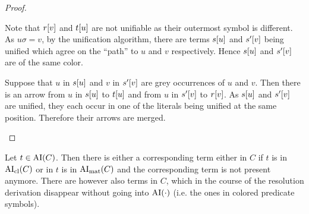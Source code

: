 \documentclass[,%
	paper=a4,%
	DIV14, %
	twoside=false,%
	liststotoc,
	bibtotoc,
	draft=false,%
	numbers=noendperiod
]{scrartcl}
\begin{document}
\begin{proof}
\begin{itemize}
			Note that $r[v]$ and $t[u]$ are not unifiable as their outermost symbol is different.
			As $u\sigma = v$, by the unification algorithm, there are terms $s[u]$ and $s'[v]$ being unified which agree on the ``path'' to $u$ and $v$ respectively.
			Hence $s[u]$ and $s'[v]$ are of the same color.


			Suppose that $u$ in $s[u]$ and $v$ in $s'[v]$ are grey occurrences of $u$ and $v$.
			Then there is an arrow from $u$ in $s[u]$ to $t[u]$ and from $u$ in $s'[v]$ to $r[v]$. 
			As $s[u]$ and $s'[v]$ are unified, they each occur in one of the literals being unified at the same position.
			Therefore their arrows are merged.
	\end{itemize}
\end{proof}

\begin{prop}
	Let $t \in \operatorname{AI}(C)$. Then there is either a corresponding term either in $C$ if $t$ is in $\operatorname{AI}_\mathrm{cl}(C)$ or 
	in $t$ is in $\operatorname{AI}_\mathrm{mat}(C)$ and the corresponding term is not present anymore.
	There are however also terms in $C$, which in the course of the resolution derivation disappear without going into $\operatorname{AI}(\cdot)$ (i.e. the ones in colored predicate symbols).
\end{prop}


\clearpage 
\end{document}
